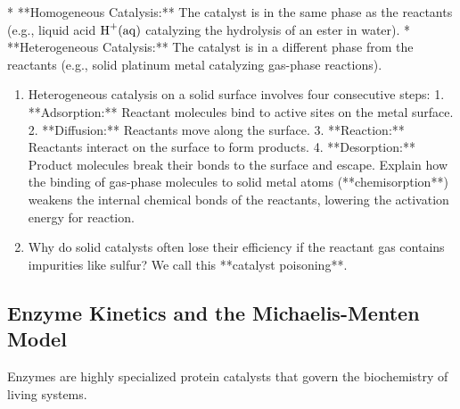 \documentclass[12pt, a4paper]{book}
\begin{document}
\begin{explobox}
* **Homogeneous Catalysis:** The catalyst is in the same phase as the reactants (e.g., liquid acid $\ce{H+(aq)}$ catalyzing the hydrolysis of an ester in water).
* **Heterogeneous Catalysis:** The catalyst is in a different phase from the reactants (e.g., solid platinum metal catalyzing gas-phase reactions).
\begin{enumerate}[label=(\alph*), leftmargin=*]
  \item Heterogeneous catalysis on a solid surface involves four consecutive steps:
        1. **Adsorption:** Reactant molecules bind to active sites on the metal surface.
        2. **Diffusion:** Reactants move along the surface.
        3. **Reaction:** Reactants interact on the surface to form products.
        4. **Desorption:** Product molecules break their bonds to the surface and escape.
        Explain how the binding of gas-phase molecules to solid metal atoms (**chemisorption**) weakens the internal chemical bonds of the reactants, lowering the activation energy for reaction.
  \item Why do solid catalysts often lose their efficiency if the reactant gas contains impurities like sulfur? We call this **catalyst poisoning**.
\end{enumerate}
\end{explobox}

\subsection{Enzyme Kinetics and the Michaelis-Menten Model}

Enzymes are highly specialized protein catalysts that govern the biochemistry of living systems.
\end{document}
